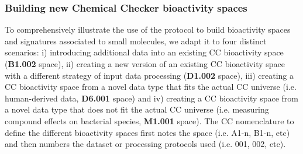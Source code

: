 \subsubsection{Building new Chemical Checker bioactivity spaces}
\label{Building_NEW_CC_BIOACTIVITY_SPACES}

To comprehensively illustrate the use of the protocol to build bioactivity spaces and signatures associated to small molecules, we adapt it to four distinct scenarios: i) introducing additional data into an existing CC bioactivity space (\textbf{B1.002} space), ii) creating a new version of an existing CC bioactivity space with a different strategy of input data processing (\textbf{D1.002} space), iii) creating a CC bioactivity space from a novel data type that fits the actual CC universe (i.e. human-derived data, \textbf{D6.001} space) and iv) creating a CC bioactivity space from a novel data type that does not fit the actual CC universe (i.e. measuring compound effects on bacterial species, \textbf{M1.001} space). The CC nomenclature to define the different bioactivity spaces first notes the space (i.e. A1-n, B1-n, etc) and then numbers the dataset or processing protocols used (i.e. 001, 002, etc).